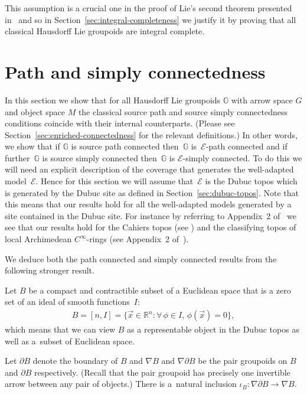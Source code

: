 \documentclass[10pt,a4paper]{amsart}
\numberwithin{equation}{section}
\begin{document}
This assumption is a crucial one in the proof of Lie's second theorem presented in~\cite{burke-relative-to-local-models} and so in Section~\ref{sec:integral-completeness} we justify it by proving that all classical Hausdorf\/f Lie groupoids are integral complete.

\section{Path and simply connectedness}\label{sec:path-and-simply-connectedness}

In this section we show that for all Hausdorf\/f Lie groupoids $\mathbb{G}$ with arrow space $G$ and object space $M$ the classical source path and source simply connectedness conditions coincide with their internal counterparts. (Please see Section~\ref{sec:enriched-connectedness} for the relevant def\/initions.) In other words, we show that if $\mathbb{G}$ is source path connected then~$\mathbb{G}$ is~$\mathcal{E}$-path connected and if further~$\mathbb{G}$ is source simply connected then~$\mathbb{G}$ is $\mathcal{E}$-simply connected. To do this we will need an explicit description of the coverage that generates the well-adapted model~$\mathcal{E}$. Hence for this section we will assume that~$\mathcal{E}$ is the Dubuc topos which is generated by the Dubuc site as def\/ined in Section~\ref{sec:dubuc-topos}. Note that this means that our results hold for all the well-adapted models generated by a site contained in the Dubuc site. For instance by referring to Appendix~2 of~\cite{MR1083355} we see that our results hold for the Cahiers topos (see \cite{MR557083}) and the classifying topos of local Archimedean $C^{\infty}$-rings (see Appendix~2 of~\cite{MR1083355}).

We deduce both the path connected and simply connected results from the following stronger result.

\begin{Notation} Let $B$ be a compact and contractible subset of a Euclidean space that is a zero set of an ideal of smooth functions~$I$:
\begin{gather*}B=[n,I]=\big\{\vec{x}\in \mathbb{R}^n\colon \forall\, \phi \in I,\, \phi(\vec{x})=0\big\},\end{gather*}
which means that we can view $B$ as a representable object in the Dubuc topos as well as a~subset of Euclidean space.

Let $\partial B$ denote the boundary of $B$ and $\nabla B$ and $\nabla\partial B$ be the pair groupoids on $B$ and $\partial B$ respectively. (Recall that the pair groupoid has precisely one invertible arrow between any pair of objects.) There is a~natural inclusion $\iota_B\colon \nabla\partial B \rightarrow \nabla B$.
\end{Notation}
\end{document}
